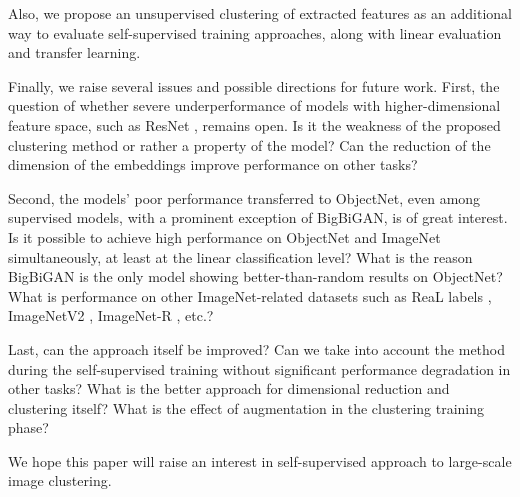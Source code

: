 \documentclass[runningheads]{llncs}
\renewcommand{\cite}[1]{\citep{#1}}
\begin{document}
Also, we propose an unsupervised clustering of extracted features as an additional way to evaluate self-supervised training approaches, along with linear evaluation and transfer learning.

Finally, we raise several issues and possible directions for future work. First, the question of whether severe underperformance of models with higher-dimensional feature space, such as ResNet , remains open. Is it the weakness of the proposed clustering method or rather a property of the model? Can the reduction of the dimension of the embeddings improve performance on other tasks?  

Second, the models' poor performance transferred to ObjectNet, even among supervised models, with a prominent exception of BigBiGAN, is of great interest. Is it possible to achieve high performance on ObjectNet and ImageNet simultaneously, at least at the linear classification level? What is the reason BigBiGAN is the only model showing better-than-random results on ObjectNet? What is performance on other ImageNet-related datasets such as ReaL labels \cite{beyer2020arewedone}, ImageNetV2 \cite{recht19imagenetv2}, ImageNet-R \cite{hendrycks2020imagenetr}, etc.?

Last, can the approach itself be improved? Can we take into account the method during the self-supervised training without significant performance degradation in other tasks? What is the better approach for dimensional reduction and clustering itself? What is the effect of augmentation in the clustering training phase?

We hope this paper will raise an interest in self-supervised approach to large-scale image clustering.   




\clearpage



\newpage

\appendix{}

\renewcommand\thefigure{\thesection.\arabic{figure}} 
\renewcommand\thetable{\thesection.\arabic{table}} 
\renewcommand\theequation{\thesection.\arabic{equation}}  
\setcounter{figure}{0}  
\setcounter{table}{0}

\end{document}
